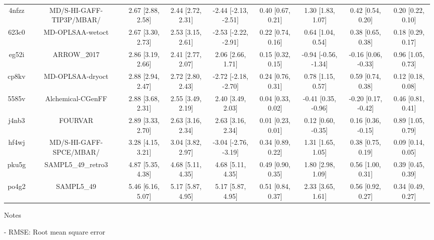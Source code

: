 \documentclass{article}
\begin{document}
\begin{center}
\begin{longtable}{|ccccccccc|}
 4nfzz &                           MD/S-HI-GAFF-TIP3P/MBAR/ &  2.67 [2.88, 2.58] &  2.44 [2.72, 2.31] &  -2.44 [-2.13, -2.51] &  0.40 [0.67, 0.21] &     1.30 [1.83, 1.07] &     0.42 [0.54, 0.20] &     0.20 [0.22, 0.10] \\
 623c0 &                                   MD-OPLSAA-wetoct &  2.67 [3.30, 2.73] &  2.53 [3.15, 2.61] &  -2.53 [-2.22, -2.91] &  0.22 [0.74, 0.16] &     0.64 [1.04, 0.54] &     0.38 [0.65, 0.38] &     0.18 [0.29, 0.17] \\
 eg52i &                                        ARROW\_2017 &  2.86 [3.19, 2.66] &  2.41 [2.77, 2.07] &     2.06 [2.66, 1.71] &  0.15 [0.32, 0.15] &  -0.94 [-0.56, -1.34] &   -0.16 [0.06, -0.33] &     0.96 [1.05, 0.73] \\
 cp8kv &                                   MD-OPLSAA-dryoct &  2.88 [2.94, 2.47] &  2.72 [2.80, 2.43] &  -2.72 [-2.18, -2.70] &  0.24 [0.76, 0.31] &     0.78 [1.15, 0.57] &     0.59 [0.74, 0.38] &     0.12 [0.18, 0.08] \\
 5585v &                                  Alchemical-CGenFF &  2.88 [3.68, 2.31] &  2.55 [3.49, 2.19] &     2.40 [3.49, 2.03] &  0.04 [0.33, 0.02] &   -0.41 [0.35, -0.96] &   -0.20 [0.17, -0.42] &     0.46 [0.81, 0.41] \\
 j4nb3 &                                            FOURVAR &  2.89 [3.33, 2.70] &  2.63 [3.16, 2.34] &     2.63 [3.16, 2.34] &  0.01 [0.23, 0.01] &    0.12 [0.60, -0.35] &    0.16 [0.36, -0.15] &     0.89 [1.05, 0.79] \\
 hf4wj &                            MD/S-HI-GAFF-SPCE/MBAR/ &  3.28 [4.15, 3.21] &  3.04 [3.82, 2.97] &  -3.04 [-2.76, -3.19] &  0.34 [0.89, 0.22] &     1.31 [1.65, 1.05] &     0.38 [0.75, 0.19] &     0.09 [0.14, 0.05] \\
 pku5g &                                 SAMPL5\_49\_retro3 &  4.87 [5.35, 4.38] &  4.68 [5.11, 4.35] &     4.68 [5.11, 4.35] &  0.49 [0.90, 0.35] &     1.80 [2.98, 1.09] &     0.56 [1.00, 0.31] &     0.39 [0.45, 0.39] \\
 po4g2 &                                         SAMPL5\_49 &  5.46 [6.16, 5.07] &  5.17 [5.87, 4.95] &     5.17 [5.87, 4.95] &  0.51 [0.84, 0.37] &     2.33 [3.65, 1.61] &     0.56 [0.92, 0.27] &     0.34 [0.49, 0.27] \\
\end{longtable}
\end{center}

Notes

- RMSE: Root mean square error
\end{document}
